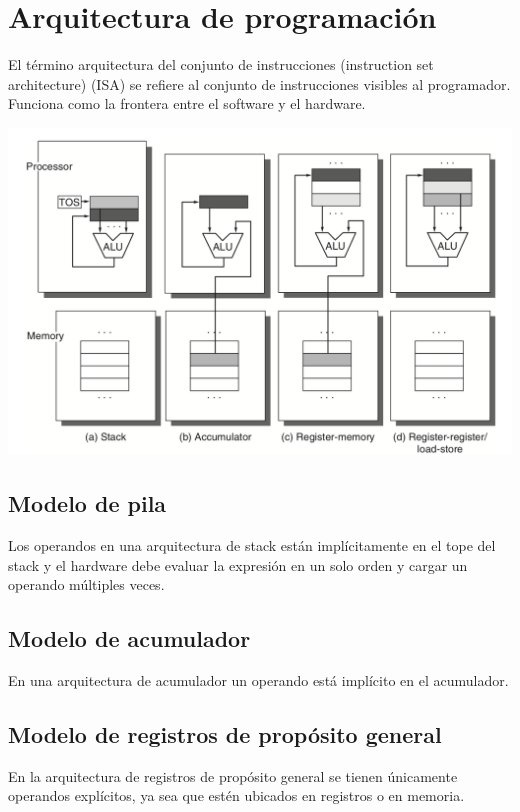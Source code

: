\chapter{Arquitectura de programación}
El término arquitectura del conjunto de instrucciones (instruction set architecture) (ISA) se refiere al conjunto de instrucciones visibles al programador. Funciona como la frontera entre el software y el hardware.

\begin{center}
 \includegraphics[scale=.6,keepaspectratio=true]{gfx/ISA.png}
\end{center}


\section{Modelo de pila}
Los operandos en una arquitectura de stack están implícitamente en el tope del stack y el hardware debe evaluar la expresión en un solo orden y cargar un operando múltiples veces.


\section{Modelo de acumulador}
En una arquitectura de acumulador un operando está implícito en el acumulador.


\section{Modelo de registros de propósito general}
En la arquitectura de registros de propósito general se tienen únicamente operandos explícitos, ya sea que estén ubicados en registros o en memoria.

